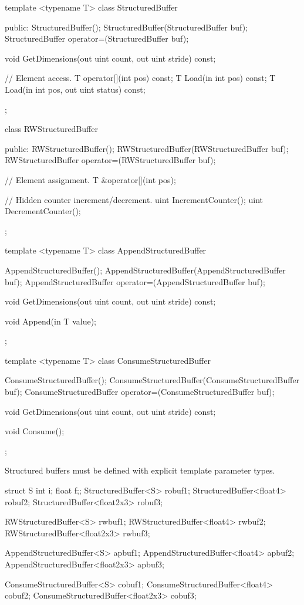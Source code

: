 \begin{HLSL}
template <typename T>
 class StructuredBuffer {
 public:
   StructuredBuffer();
   StructuredBuffer(StructuredBuffer buf);
   StructuredBuffer operator=(StructuredBuffer buf);

   void GetDimensions(out uint count, out uint stride) const;

   // Element access.
   T operator[](int pos) const;
   T Load(in int pos) const;
   T Load(in int pos, out uint status) const;
};

 class RWStructuredBuffer {
 public:
   RWStructuredBuffer();
   RWStructuredBuffer(RWStructuredBuffer buf);
   RWStructuredBuffer operator=(RWStructuredBuffer buf);

   // Element assignment.
   T &operator[](int pos);

   // Hidden counter increment/decrement.
   uint IncrementCounter();
   uint DecrementCounter();
};

template <typename T>
 class AppendStructuredBuffer {
   AppendStructuredBuffer();
   AppendStructuredBuffer(AppendStructuredBuffer buf);
   AppendStructuredBuffer operator=(AppendStructuredBuffer buf);

   void GetDimensions(out uint count, out uint stride) const;

   void Append(in T value);
};

template <typename T>
 class ConsumeStructuredBuffer {
   ConsumeStructuredBuffer();
   ConsumeStructuredBuffer(ConsumeStructuredBuffer buf);
   ConsumeStructuredBuffer operator=(ConsumeStructuredBuffer buf);

   void GetDimensions(out uint count, out uint stride) const;

   void Consume();
};

\end{HLSL}


Structured buffers must be defined with explicit template parameter types.
\begin{HLSL}
  struct S {int i; float f;};
  StructuredBuffer<S> robuf1;
  StructuredBuffer<float4> robuf2;
  StructuredBuffer<float2x3> robuf3;

  RWStructuredBuffer<S> rwbuf1;
  RWStructuredBuffer<float4> rwbuf2;
  RWStructuredBuffer<float2x3> rwbuf3;

  AppendStructuredBuffer<S> apbuf1;
  AppendStructuredBuffer<float4> apbuf2;
  AppendStructuredBuffer<float2x3> apbuf3;

  ConsumeStructuredBuffer<S> cobuf1;
  ConsumeStructuredBuffer<float4> cobuf2;
  ConsumeStructuredBuffer<float2x3> cobuf3;
\end{HLSL}

